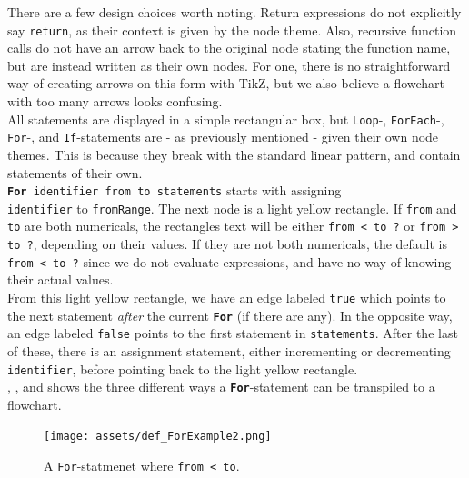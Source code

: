 There are a few design choices worth noting. Return expressions do not explicitly say \texttt{return}, as their context is given by the node theme. Also, recursive function calls do not have an arrow back to the original node stating the function name, but are instead written as their own nodes. For one, there is no straightforward way of creating arrows on this form with TikZ, but we also believe a flowchart with too many arrows looks confusing. \\

All statements are displayed in a simple rectangular box, but \texttt{Loop}-, \texttt{ForEach}-, \texttt{For}-, and \texttt{If}-statements are - as previously mentioned - given their own node themes. This is because they break with the standard linear pattern, and contain statements of their own. \\

\texttt{\textbf{For} identifier from to statements} starts with assigning \\ \texttt{identifier} to \texttt{fromRange}. The next node is a light yellow rectangle. If \texttt{from} and \texttt{to} are both numericals, the rectangles text will be either \texttt{from < to ?} or \texttt{from > to ?}, depending on their values. If they are not both numericals, the default is \texttt{from < to ?} since we do not evaluate expressions, and have no way of knowing their actual values. \\

From this light yellow rectangle, we have an edge labeled \texttt{true} which points to the next statement \textit{after} the current \texttt{\textbf{For}} (if there are any). In the opposite way, an edge labeled \texttt{false} points to the first statement in \texttt{statements}. After the last of these, there is an assignment statement, either incrementing or decrementing \texttt{identifier}, before pointing back to the light yellow rectangle. \\

, , and  shows the three different ways a \texttt{\textbf{For}}-statement can be transpiled to a flowchart. \\

\begin{figure}[ht]
    \centering
    \texttt{[image: assets/def\_ForExample2.png]}
    \caption{A \texttt{For}-statmenet where \texttt{from < to}.}
    \label{forExample1}
\end{figure}

